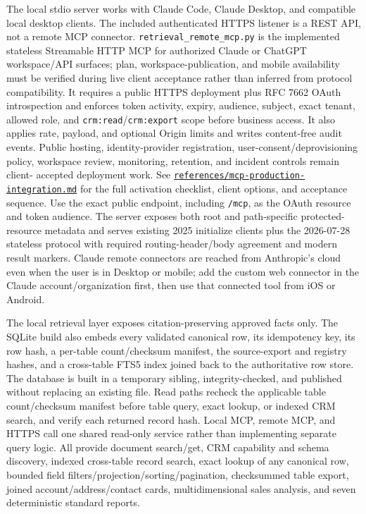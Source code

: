 \documentclass[
]{article}
\begin{document}
The local stdio server works with Claude Code, Claude Desktop, and
compatible local desktop clients. The included authenticated HTTPS
listener is a REST API, not a remote MCP connector.
\texttt{retrieval\_\allowbreak{}remote\_\allowbreak{}mcp.py} is the
implemented stateless Streamable HTTP MCP for authorized Claude or
ChatGPT workspace/API surfaces; plan, workspace-publication, and mobile
availability must be verified during live client acceptance rather than
inferred from protocol compatibility. It requires a public HTTPS
deployment plus RFC 7662 OAuth introspection and enforces token
activity, expiry, audience, subject, exact tenant, allowed role, and
\texttt{crm:read}/\texttt{crm:export} scope before business access. It
also applies rate, payload, and optional Origin limits and writes
content-free audit events. Public hosting, identity-provider
registration, user-consent/deprovisioning policy, workspace review,
monitoring, retention, and incident controls remain client- accepted
deployment work. See
\href{../references/mcp-production-integration.md}{\texttt{references/\allowbreak{}mcp-\allowbreak{}production-\allowbreak{}integration.md}}
for the full activation checklist, client options, and acceptance
sequence. Use the exact public endpoint, including
\texttt{/\allowbreak{}mcp}, as the OAuth resource and token audience.
The server exposes both root and path-specific protected-resource
metadata and serves existing 2025 initialize clients plus the 2026-07-28
stateless protocol with required routing-header/body agreement and
modern result markers. Claude remote connectors are reached from
Anthropic's cloud even when the user is in Desktop or mobile; add the
custom web connector in the Claude account/organization first, then use
that connected tool from iOS or Android.

The local retrieval layer exposes citation-preserving approved facts
only. The SQLite build also embeds every validated canonical row, its
idempotency key, its row hash, a per-table count/checksum manifest, the
source-export and registry hashes, and a cross-table FTS5 index joined
back to the authoritative row store. The database is built in a
temporary sibling, integrity-checked, and published without replacing an
existing file. Read paths recheck the applicable table count/checksum
manifest before table query, exact lookup, or indexed CRM search, and
verify each returned record hash. Local MCP, remote MCP, and HTTPS call
one shared read-only service rather than implementing separate query
logic. All provide document search/get, CRM capability and schema
discovery, indexed cross-table record search, exact lookup of any
canonical row, bounded field filters/projection/sorting/pagination,
checksummed table export, joined account/address/contact cards,
multidimensional sales analysis, and seven deterministic standard
reports.
\end{document}
